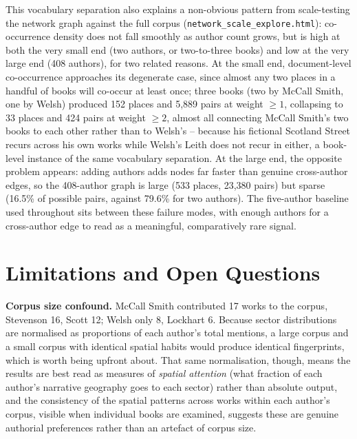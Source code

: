 \documentclass[logo,msc]{infthesis}
\begin{document}
This vocabulary separation also explains a non-obvious pattern from scale-testing the network graph against the full corpus (\texttt{network\_scale\_explore.html}): co-occurrence density does not fall smoothly as author count grows, but is high at both the very small end (two authors, or two-to-three books) and low at the very large end (408 authors), for two related reasons. At the small end, document-level co-occurrence approaches its degenerate case, since almost any two places in a handful of books will co-occur at least once; three books (two by McCall Smith, one by Welsh) produced 152 places and 5,889 pairs at weight $\geq 1$, collapsing to 33 places and 424 pairs at weight $\geq 2$, almost all connecting McCall Smith's two books to each other rather than to Welsh's -- because his fictional Scotland Street recurs across his own works while Welsh's Leith does not recur in either, a book-level instance of the same vocabulary separation. At the large end, the opposite problem appears: adding authors adds nodes far faster than genuine cross-author edges, so the 408-author graph is large (533 places, 23,380 pairs) but sparse (16.5\% of possible pairs, against 79.6\% for two authors). The five-author baseline used throughout sits between these failure modes, with enough authors for a cross-author edge to read as a meaningful, comparatively rare signal.
 
\section{Limitations and Open Questions}
\label{sec:limitations}
 
\textbf{Corpus size confound.} McCall Smith contributed 17 works to the corpus, Stevenson 16, Scott 12; Welsh only 8, Lockhart 6. Because sector distributions are normalised as proportions of each author's total mentions, a large corpus and a small corpus with identical spatial habits would produce identical fingerprints, which is worth being upfront about. That same normalisation, though, means the results are best read as measures of \emph{spatial attention} (what fraction of each author's narrative geography goes to each sector) rather than absolute output, and the consistency of the spatial patterns across works within each author's corpus, visible when individual books are examined, suggests these are genuine authorial preferences rather than an artefact of corpus size.
 
\end{document}

